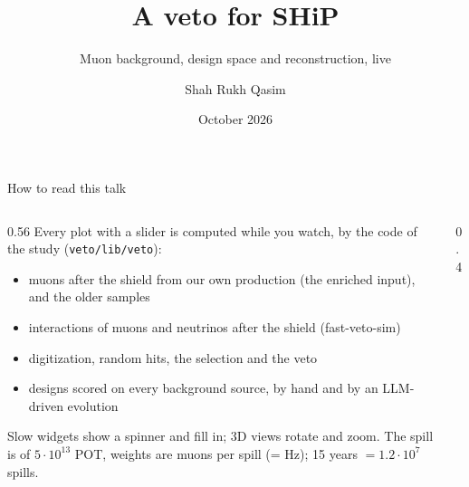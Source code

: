 \documentclass[aspectratio=169,10pt]{beamer}
\title[A veto for SHiP, live]{A veto for SHiP}
\subtitle{Muon background, design space and reconstruction, live}
\author{Shah Rukh Qasim}
\institute{University of Zurich · with G.~Frisella}
\date{October 2026}
\begin{document}
\begin{frame}
  \titlepage
\end{frame}

\begin{frame}{How to read this talk}
  \begin{columns}[c]
    \begin{column}{0.56\textwidth}\footnotesize
      Every plot with a slider is computed while you watch, by the code of the study (\texttt{veto/lib/veto}):
      \begin{itemize}
        \item muons after the shield from our own production (the enriched input), and the older samples
        \item interactions of muons and neutrinos after the shield (fast-veto-sim)
        \item digitization, random hits, the selection and the veto
        \item designs scored on every background source, by hand and by an LLM-driven evolution
      \end{itemize}
      \vspace{1mm}
      Slow widgets show a spinner and fill in; 3D views rotate and zoom. The spill is  of $5\cdot10^{13}$ POT, weights are muons per spill (= Hz); 15 years $= 1.2\cdot10^{7}$ spills.\\[0.3mm]
    \end{column}
    \begin{column}{0.4\textwidth}\centering
\end{column}
\end{columns}
\end{frame}
\end{document}
